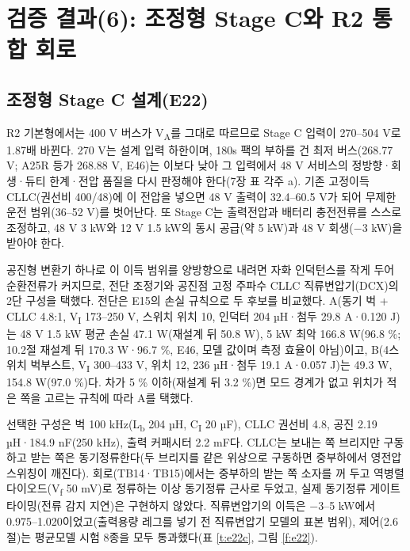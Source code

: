 \chapter{검증 결과(6): 조정형 Stage C와 R2 통합 회로}

\section{조정형 Stage C 설계(E22)}

R2 기본형에서는 400 V 버스가 V\textsubscript{A}를 그대로 따르므로 Stage C 입력이 270–504 V로 1.87배 바뀐다. 270 V는 설계 입력 하한이며, 180s 팩의 부하를 건 최저 버스(268.77 V; A25R 등가 268.88 V, E46)는 이보다 낮아 그 입력에서 48 V 서비스의 정방향·회생·듀티 한계·전압 품질을 다시 판정해야 한다(7장 표 각주 a). 기존 고정이득 CLLC(권선비 400/48)에 이 전압을 넣으면 48 V 출력이 32.4–60.5 V가 되어 무제한 운전 범위(36–52 V)\cite{b10}를 벗어난다. 또 Stage C는 출력전압과 배터리 충전전류를 스스로 조정하고, 48 V 3 kW와 12 V 1.5 kW의 동시 공급(약 5 kW)과 48 V 회생(−3 kW)을 받아야 한다.

공진형 변환기 하나로 이 이득 범위를 양방향으로 내려면 자화 인덕턴스를 작게 두어 순환전류가 커지므로, 전단 조정기와 공진점 고정 주파수 CLLC 직류변압기(DCX)의 2단 구성을 택했다\cite{b17,b18}. 전단은 E15의 손실 규칙으로 두 후보를 비교했다. A(동기 벅 + CLLC 4.8:1, V\textsubscript{I} 173–250 V, 스위치 위치 10, 인덕터 204 µH·첨두 29.8 A·0.120 J)는 48 V 1.5 kW 평균 손실 47.1 W(재설계 뒤 50.8 W), 5 kW 최악 166.8 W(96.8 \%; 10.2절 재설계 뒤 170.3 W·96.7 \%, E46, 모델 값이며 측정 효율이 아님)이고, B(4스위치 벅부스트, V\textsubscript{I} 300–433 V, 위치 12, 236 µH·첨두 19.1 A·0.057 J)는 49.3 W, 154.8 W(97.0 \%)다. 차가 5 \% 이하(재설계 뒤 3.2 \%)면 모드 경계가 없고 위치가 적은 쪽을 고르는 규칙에 따라 A를 택했다.


선택한 구성은 벅 100 kHz(L\textsubscript{b} 204 µH, C\textsubscript{I} 20 µF), CLLC 권선비 4.8, 공진 2.19 µH·184.9 nF(250 kHz), 출력 커패시터 2.2 mF다. CLLC는 보내는 쪽 브리지만 구동하고 받는 쪽은 동기정류한다(두 브리지를 같은 위상으로 구동하면 중부하에서 영전압 스위칭이 깨진다). 회로(TB14·TB15)에서는 중부하의 받는 쪽 소자를 꺼 두고 역병렬 다이오드(V\textsubscript{f} 50 mV)로 정류하는 이상 동기정류 근사로 두었고, 실제 동기정류 게이트 타이밍(전류 감지 지연)은 구현하지 않았다. 직류변압기의 이득은 −3–5 kW에서 0.975–1.020이었고(출력용량 레그를 넣기 전 직류변압기 모델의 표본 범위), 제어(2.6절)는 평균모델 시험 8종을 모두 통과했다(표 \ref{t:e22c}, 그림 \ref{f:e22}).

